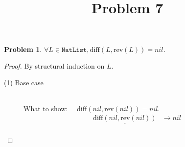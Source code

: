 \documentclass[12pt, a4paper]{article}
\title{Problem 7}
\date{\vspace{-5ex}}
\newtheorem{problem}{Problem}
\newcommand{\rmx}[1]{\mathrm{#1}}
\newcommand{\larrow}{\longrightarrow}
\newcommand{\under}{\underline}
\begin{document}
\maketitle

\begin{problem}
$\forall L \in \mathtt{NatList}, \rmx{diff}(L, \rmx{rev}(L)) = nil$.
\end{problem}
\begin{proof}
By structural induction on $L$.

\begin{description}
\item[(1) Base case]~\\
\noindent
What to show: $\quad \rmx{diff}(nil, \rmx{rev}(nil)) = nil$.
\begin{align*}
\under{\rmx{diff}(nil, \rmx{rev}(nil))}
	&\larrow nil \tag{by diff1} \\
\end{align*}


\end{description}
\end{proof}
\end{document}
